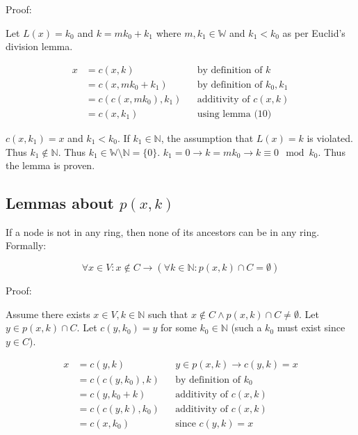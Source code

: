\documentclass[11pt]{article}
\begin{document}
    Proof:

    Let $L(x)=k_{0}$ and $k=mk_{0}+k_{1}$ where $m,k_{1} \in \mathbb{W}$ and $k_{1}<k_{0}$ as per Euclid's division lemma.

    \begin{align*}
        \text{$x$} &= \text{$c(x,k)$} && \text{by definition of $k$} \\
        &= \text{$c(x,mk_{0}+k_{1})$} && \text{by definition of $k_{0},k_{1}$} \\
        &= \text{$c(c(x,mk_{0}),k_{1})$} && \text{additivity of $c(x,k)$} \\
        &= \text{$c(x,k_{1})$} && \text{using lemma (10)}
    \end{align*}

    $c(x,k_{1})=x$ and $k_{1}<k_{0}$. If $k_{1} \in \mathbb{N}$, the assumption that $L(x)=k$ is violated. Thus $k_{1} \notin \mathbb{N}$. Thus $k_{1} \in \mathbb{W} \setminus \mathbb{N} = \{0\}$. $k_{1}=0 \rightarrow k=mk_{0} \rightarrow k \equiv 0 \mod k_{0}$. Thus the lemma is proven.

    \subsection{Lemmas about $p(x,k)$}

    If a node is not in any ring, then none of its ancestors can be in any ring. Formally:

    \begin{equation}
        \forall x \in V: x \notin C \rightarrow (\forall k \in \mathbb{N} : p(x,k) \cap C = \emptyset)
    \end{equation}

    Proof:

    Assume there exists $x \in V, k \in \mathbb{N}$ such that $x \notin C \land p(x,k) \cap C \not = \emptyset$. Let $y \in p(x,k) \cap C$. Let $c(y,k_{0})=y$ for some $k_{0} \in \mathbb{N}$ (such a $k_{0}$ must exist since $y \in C$).

    \begin{align*}
        \text{$x$} &= \text{$c(y,k)$} && \text{$y \in p(x,k) \rightarrow c(y,k) = x$} \\
        &= \text{$c(c(y,k_{0}),k)$} && \text{by definition of $k_{0}$} \\
        &= \text{$c(y,k_{0}+k)$} && \text{additivity of $c(x,k)$} \\
        &= \text{$c(c(y,k),k_{0})$} && \text{additivity of $c(x,k)$} \\
        &= \text{$c(x,k_{0})$} && \text{since $c(y,k) = x$}
    \end{align*}
\end{document}

